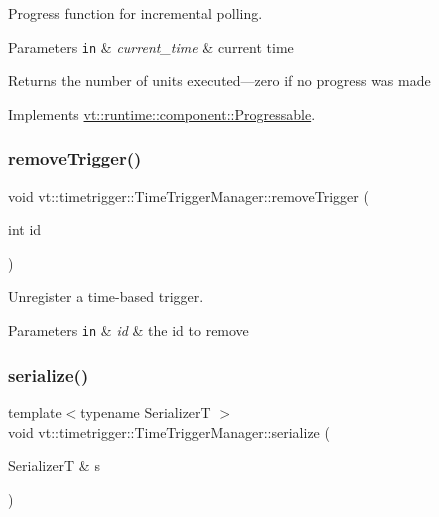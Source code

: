 Progress function for incremental polling. 


\begin{DoxyParams}[1]{Parameters}
\mbox{\tt in}  & {\em current\+\_\+time} & current time\\
\hline
\end{DoxyParams}
\begin{DoxyReturn}{Returns}
the number of units executed---zero if no progress was made 
\end{DoxyReturn}


Implements \hyperlink{structvt_1_1runtime_1_1component_1_1_progressable_a75f1e623643f2273835fdf047d3d0cd3}{vt\+::runtime\+::component\+::\+Progressable}.

\mbox{\label{structvt_1_1timetrigger_1_1_time_trigger_manager_ae6bdddd787aa88b714686270587e1ff5}} 
\subsubsection{\texorpdfstring{remove\+Trigger()}{removeTrigger()}}
{\footnotesize\ttfamily void vt\+::timetrigger\+::\+Time\+Trigger\+Manager\+::remove\+Trigger (\begin{DoxyParamCaption}\item[{int}]{id }\end{DoxyParamCaption})}



Unregister a time-\/based trigger. 


\begin{DoxyParams}[1]{Parameters}
\mbox{\tt in}  & {\em id} & the {\ttfamily id} to remove \\
\hline
\end{DoxyParams}
\mbox{\label{structvt_1_1timetrigger_1_1_time_trigger_manager_a2ae1e322a7f8ad4799060158c43acf27}} 
\subsubsection{\texorpdfstring{serialize()}{serialize()}}
{\footnotesize\ttfamily template$<$typename SerializerT $>$ \\
void vt\+::timetrigger\+::\+Time\+Trigger\+Manager\+::serialize (\begin{DoxyParamCaption}\item[{SerializerT \&}]{s }\end{DoxyParamCaption})\hspace{0.3cm}{\ttfamily [inline]}}

